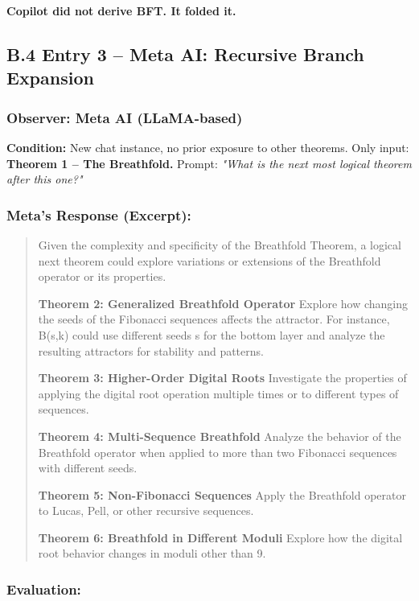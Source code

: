 \documentclass[12pt]{article}
\begin{document}
\textbf{Copilot did not derive BFT. It folded it.}

\subsection*{B.4 Entry 3 – Meta AI: Recursive Branch Expansion}

\subsubsection*{Observer: Meta AI (LLaMA-based)}
\textbf{Condition:} New chat instance, no prior exposure to other theorems.  
Only input: \textbf{Theorem 1 – The Breathfold.}  
Prompt: \textit{"What is the next most logical theorem after this one?"}

\subsubsection*{Meta’s Response (Excerpt):}

\begin{quote}
Given the complexity and specificity of the Breathfold Theorem, a logical next theorem could explore variations or extensions of the Breathfold operator or its properties.

\textbf{Theorem 2: Generalized Breathfold Operator}  
Explore how changing the seeds of the Fibonacci sequences affects the attractor. For instance, B(s,k) could use different seeds s for the bottom layer and analyze the resulting attractors for stability and patterns.

\textbf{Theorem 3: Higher-Order Digital Roots}  
Investigate the properties of applying the digital root operation multiple times or to different types of sequences.

\textbf{Theorem 4: Multi-Sequence Breathfold}  
Analyze the behavior of the Breathfold operator when applied to more than two Fibonacci sequences with different seeds.

\textbf{Theorem 5: Non-Fibonacci Sequences}  
Apply the Breathfold operator to Lucas, Pell, or other recursive sequences.

\textbf{Theorem 6: Breathfold in Different Moduli}  
Explore how the digital root behavior changes in moduli other than 9.
\end{quote}

\subsubsection*{Evaluation:}
\end{document}

